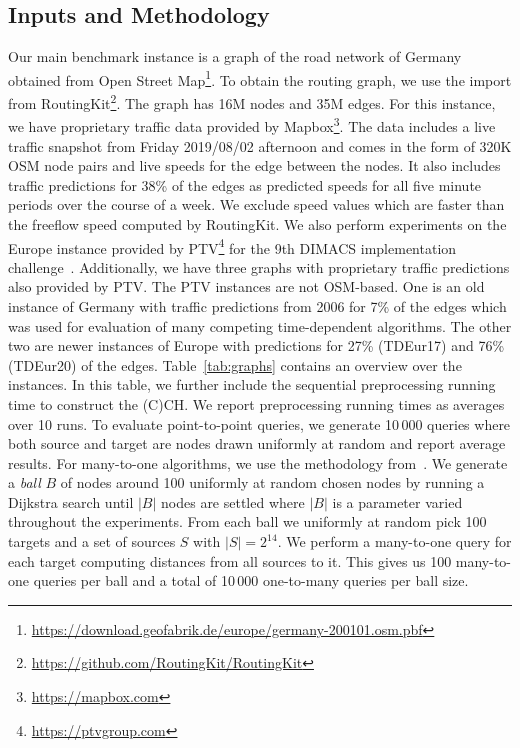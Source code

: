 \documentclass[manuscript,review]{acmart}
\begin{document}
\subsection{Inputs and Methodology}
Our main benchmark instance is a graph of the road network of Germany obtained from Open Street Map\footnote{\url{https://download.geofabrik.de/europe/germany-200101.osm.pbf}}.
To obtain the routing graph, we use the import from RoutingKit\footnote{\url{https://github.com/RoutingKit/RoutingKit}}.
The graph has 16M nodes and 35M edges.
For this instance, we have proprietary traffic data provided by Mapbox\footnote{\url{https://mapbox.com}}.
The data includes a live traffic snapshot from Friday 2019/08/02 afternoon and comes in the form of 320K OSM node pairs and live speeds for the edge between the nodes.
It also includes traffic predictions for 38\% of the edges as predicted speeds for all five minute periods over the course of a week.
We exclude speed values which are faster than the freeflow speed computed by RoutingKit.
We also perform experiments on the Europe instance provided by PTV\footnote{\url{https://ptvgroup.com}} for the 9th DIMACS implementation challenge~\cite{DemetrescuGJ09}.
Additionally, we have three graphs with proprietary traffic predictions also provided by PTV.
The PTV instances are not OSM-based.
One is an old instance of Germany with traffic predictions from 2006 for 7\% of the edges which was used for evaluation of many competing time-dependent algorithms.
The other two are newer instances of Europe with predictions for 27\% (TDEur17) and 76\% (TDEur20) of the edges.
Table~\ref{tab:graphs} contains an overview over the instances.
In this table, we further include the sequential preprocessing running time to construct the (C)CH.
We report preprocessing running times as averages over 10 runs.
To evaluate point-to-point queries, we generate 10\,000 queries where both source and target are nodes drawn uniformly at random and report average results.
For many-to-one algorithms, we use the methodology from~\cite{delling_et_al:OASIcs:2011:3266}.
We generate a \emph{ball} $B$ of nodes around 100 uniformly at random chosen nodes by running a Dijkstra search until $|B|$ nodes are settled where $|B|$ is a parameter varied throughout the experiments.
From each ball we uniformly at random pick 100 targets and a set of sources $S$ with $|S| = 2^{14}$.
We perform a many-to-one query for each target computing distances from all sources to it.
This gives us 100 many-to-one queries per ball and a total of 10\,000 one-to-many queries per ball size.
\end{document}
